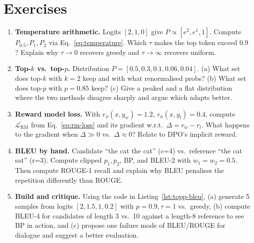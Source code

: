 \section{Exercises}
\label{sec:ch08-exercises}
\begin{enumerate}[label=E8.\arabic*, leftmargin=*, itemsep=0.7em]
    \item \textbf{Temperature arithmetic.} Logits $[2,1,0]$ give $P\propto[e^2,e^1,1]$. Compute $P_{0.5},P_1,P_2$ via Eq.~\eqref{eq:temperature}. Which $\tau$ makes the top token exceed $0.9$? Explain why $\tau\to0$ recovers greedy and $\tau\to\infty$ recovers uniform.
    \item \textbf{Top-$k$ vs.\ top-$p$.} Distribution $P=[0.5,0.3,0.1,0.06,0.04]$. (a) What set does top-$k$ with $k=2$ keep and with what renormalised probs? (b) What set does top-$p$ with $p=0.85$ keep? (c) Give a peaked and a flat distribution where the two methods disagree sharply and argue which adapts better.
    \item \textbf{Reward model loss.} With $r_\phi(x,y_w)=1.2$, $r_\phi(x,y_l)=0.4$, compute $\mathcal{L}_{\text{RM}}$ from Eq.~\eqref{eq:rm-loss} and its gradient w.r.t.\ $\Delta=r_w-r_l$. What happens to the gradient when $\Delta\gg0$ vs.\ $\Delta\approx0$? Relate to DPO's implicit reward.
    \item \textbf{BLEU by hand.} Candidate ``the cat the cat'' (c=4) vs.\ reference ``the cat sat'' (r=3). Compute clipped $p_1,p_2$, BP, and BLEU-2 with $w_1=w_2=0.5$. Then compute ROUGE-1 recall and explain why BLEU penalises the repetition differently than ROUGE.
    \item \textbf{Build and critique.} Using the code in Listing~\ref{lst:topp-bleu}, (a) generate 5 samples from logits $[2,1.5,1,0.2]$ with $p=0.9,\tau=1$ vs.\ greedy, (b) compute BLEU-4 for candidates of length 3 vs.\ 10 against a length-8 reference to see BP in action, and (c) propose one failure mode of BLEU/ROUGE for dialogue and suggest a better evaluation.
\end{enumerate}
